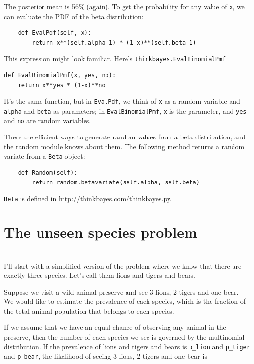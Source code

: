 \documentclass[12pt]{book}
\begin{document}
The posterior mean is 56\% (again).  To get the probability for
any value of {\tt x}, we can evaluate the PDF of the beta
distribution:

\begin{verbatim}
    def EvalPdf(self, x):
        return x**(self.alpha-1) * (1-x)**(self.beta-1)
\end{verbatim}

This expression might look familiar.  Here's {\tt thinkbayes.EvalBinomialPmf}

\begin{verbatim}
def EvalBinomialPmf(x, yes, no): 
    return x**yes * (1-x)**no
\end{verbatim}

It's the same function, but in {\tt EvalPdf}, we think of {\tt x} as a
random variable and {\tt alpha} and {\tt beta} as parameters; in 
{\tt EvalBinomialPmf}, {\tt x} is the parameter, and {\tt yes} and
{\tt no} are random variables.

There are efficient ways to generate random values from a beta
distribution, and the random module knows about them.  The
following method returns a random variate from a {\tt Beta}
object:

\begin{verbatim}
    def Random(self):
        return random.betavariate(self.alpha, self.beta)
\end{verbatim}

{\tt Beta} is defined in \url{http://thinkbayes.com/thinkbayes.py}.


\section{The unseen species problem}



\section{}

I'll start with a simplified version of the problem where we know
that there are exactly three species.  Let's call them lions and tigers
and bears.

Suppose we visit a wild animal preserve and see 3 lions, 2 tigers and
one bear.  We would like to estimate the prevalence of each species, which
is the fraction of the total animal population that belongs to each
species.

If we assume that we have an equal chance of observing any animal
in the preserve, then the number of each species we see is governed
by the multinomial distribution.  If the prevalence of lions and tigers
and bears is \verb"p_lion" and \verb"p_tiger" and \verb"p_bear",
the likelihood of seeing  3 lions, 2 tigers and one bear is
\end{document}

